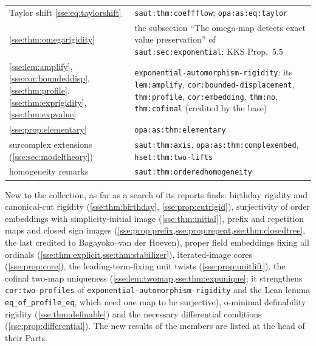 \documentclass[11pt,a4paper]{article}
\numberwithin{equation}{section}
\theoremstyle{plain}
\theoremstyle{definition}
\theoremstyle{remark}
\newcommand{\code}[1]{\texttt{\small #1}}
\newcommand{\lbl}[1]{\nolinkurl{#1}}%
\newcommand{\fn}[1]{\nolinkurl{#1}}%
\begin{document}
\begin{longtable}{P{52mm}P{97mm}}
Taylor shift \cref{sse:eq:taylorshift} & \lbl{saut:thm:coeffflow}; \lbl{opa:as:eq:taylor} \\
\cref{sse:thm:omegarigidity} & the subsection ``The omega-map detects exact value preservation'' of \lbl{saut:sec:exponential}; KKS Prop.~5.5 \\
\cref{sse:lem:amplify}, \cref{sse:cor:boundeddisp}, \cref{sse:thm:profile}, \cref{sse:thm:exprigidity}, \cref{sse:thm:expvalue} & \fn{exponential-automorphism-rigidity}: its \lbl{lem:amplify}, \lbl{cor:bounded-displacement}, \lbl{thm:profile}, \lbl{cor:embedding}, \lbl{thm:no}, \lbl{thm:cofinal} (credited by the base) \\
\cref{sse:prop:elementary} & \lbl{opa:as:thm:elementary} \\
surcomplex extensions (\cref{sse:sec:modeltheory}) & \lbl{saut:thm:axis}, \lbl{opa:as:thm:complexembed}, \lbl{hset:thm:two-lifts} \\
homogeneity remarks & \lbl{saut:thm:orderedhomogeneity} \\
\bottomrule
\end{longtable}

\noindent New to the collection, as far as a search of its reports finds:
birthday rigidity and canonical-cut rigidity (\cref{sse:thm:birthday},
\cref{sse:prop:cutrigid}), surjectivity of order embeddings with
simplicity-initial image (\cref{sse:thm:initial}), prefix and repetition maps
and closed sign images (\cref{sse:prop:prefix,sse:prop:repeat,sse:thm:closedtree},
the last credited to Bagayoko--van der Hoeven), proper field embeddings fixing
all ordinals (\cref{sse:thm:explicit,sse:thm:stabilizer}), iterated-image cores
(\cref{sse:prop:core}), the leading-term-fixing unit twists
(\cref{sse:prop:unitlift}), the cofinal two-map uniqueness
(\cref{sse:lem:twomap,sse:thm:expunique}; it strengthens
\lbl{cor:two-profiles} of \fn{exponential-automorphism-rigidity} and the Lean
lemma \code{eq\_of\_profile\_eq}, which need one map to be surjective),
o-minimal definability rigidity (\cref{sse:thm:definable}) and the
necessary differential conditions (\cref{sse:prop:differential}). The new
results of the members are listed at the head of their Parts.
\end{document}
